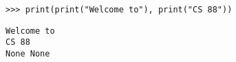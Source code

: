 \begin{lstlisting}
>>> print(print("Welcome to"), print("CS 88"))
\end{lstlisting}

\begin{solution}[0.5in]
\begin{verbatim}
Welcome to
CS 88
None None
\end{verbatim}
\end{solution}
